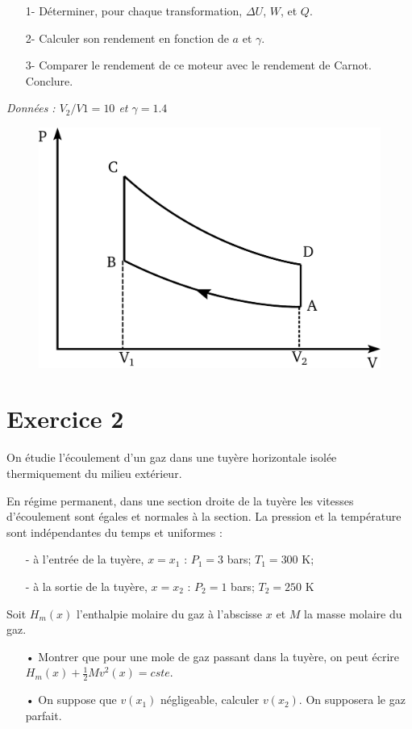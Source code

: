 \documentclass{report}
\begin{document}
\begin{itemize}
\item[1-] Déterminer, pour chaque transformation, $\Delta U$, $W$, et $Q$. 
	\item[2-] Calculer son rendement en fonction de $a$ et $\gamma$.

	\item[3-]  Comparer le rendement de ce moteur avec le rendement de Carnot. Conclure.
\end{itemize}

\textit{Données : $ V_{2}/V{1} = 10$ et $ \gamma=1.4$}

\begin{figure}[!h]
\centering
\includegraphics[width=0.3\linewidth]{cycle_beau_rochas.pdf}
\end{figure}



\newpage

\section*{Exercice 2}

On étudie l'écoulement d'un gaz dans une tuyère horizontale isolée thermiquement du milieu extérieur.

En régime permanent, dans une section droite de la tuyère les vitesses d'écoulement sont égales et normales à la section. La pression et la température sont indépendantes du temps et uniformes :
\begin{itemize}
\item[-]à l'entrée de la tuyère, $x=x_{1}$ : $P_{1} = 3$ bars; $T_{1} = 300$ K;
\item[-]à la sortie de la tuyère, $x=x_{2}$ : $P_{2} = 1$ bars; $T_{2} = 250$ K
\end{itemize}

Soit $H_{m}(x)$ l'enthalpie molaire du gaz à l'abscisse $x$ et $M$ la masse molaire du gaz. 

\begin{itemize}
\item[•] Montrer que pour une mole de gaz passant dans la tuyère, on peut écrire $H_{m}(x)+\frac{1}{2}Mv^{2}(x)= cste$.
\item[•] On suppose que $v(x_{1})$ négligeable, calculer $v(x_{2})$. On supposera le gaz parfait. 
\end{itemize}
\end{document}
